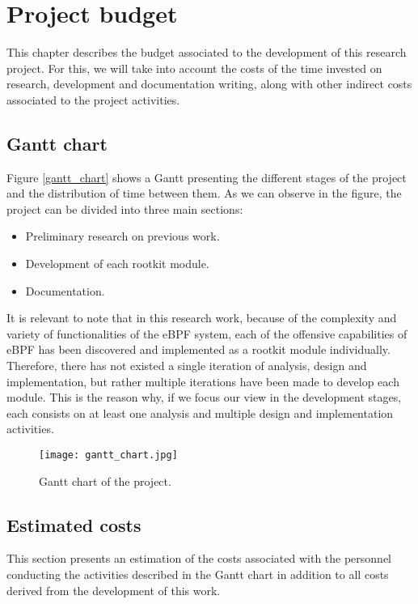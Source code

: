 \chapter{Project budget}
This chapter describes the budget associated to the development of this
research project. For this, we will take into account the costs of the time
invested on research, development and documentation writing, along with
other indirect costs associated to the project activities.

\section{Gantt chart}
Figure \ref{gantt_chart} shows a Gantt presenting the different stages of the project and the distribution of time between them. As we can observe in the figure, the project can be divided into three main sections:
\begin{itemize}
\item Preliminary research on previous work.
\item Development of each rootkit module.
\item Documentation.
\end{itemize}

It is relevant to note that in this research work, because of the complexity and variety of functionalities of the eBPF system, each of the offensive capabilities of eBPF has been discovered and implemented as a rootkit module individually. Therefore, there has not existed a single iteration of analysis, design and implementation, but rather multiple iterations have been made to develop each module. This is the reason why, if we focus our view in the development stages, each consists on at least one analysis and multiple design and implementation activities.


\begin{figure}[htbp]
	\centering
	\texttt{[image: gantt\_chart.jpg]}
	\caption{Gantt chart of the project.}
	\label{fig:gantt_chart}
\end{figure}

\section{Estimated costs}
This section presents an estimation of the costs associated with the  personnel conducting the activities described in the Gantt chart in addition to all costs derived from the development of this work.

